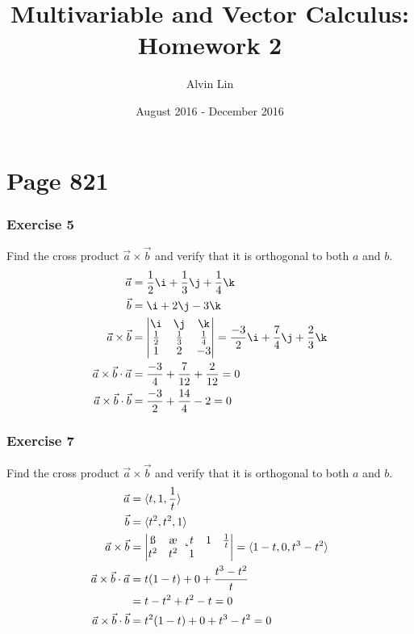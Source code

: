 \documentclass[letterpaper, 12pt]{math}
\title{Multivariable and Vector Calculus: Homework 2}
\author{Alvin Lin}
\date{August 2016 - December 2016}
\begin{document}
\maketitle

\section*{Page 821}

\subsubsection*{Exercise 5}
Find the cross product \( \vec{a}\times\vec{b} \) and verify that it is
orthogonal to both \( a \) and \( b \).
\begin{align*}
  \vec{a} &= \frac{1}{2}\i+\frac{1}{3}\j+\frac{1}{4}\k \\
  \vec{b} &= \i+2\j-3\k \\
  \vec{a}\times\vec{b} &= \begin{vmatrix}
    \i & \j & \k \\
    \frac{1}{2} & \frac{1}{3} & \frac{1}{4} \\
    1 & 2 & -3
  \end{vmatrix} = \frac{-3}{2}\i+\frac{7}{4}\j+\frac{2}{3}\k \\
  \vec{a}\times\vec{b}\cdot\vec{a} &=
    \frac{-3}{4}+\frac{7}{12}+\frac{2}{12} = 0 \\
  \vec{a}\times\vec{b}\cdot\vec{b} &=
    \frac{-3}{2}+\frac{14}{4}-2 = 0
\end{align*}

\subsubsection*{Exercise 7}
Find the cross product \( \vec{a}\times\vec{b} \) and verify that it is
orthogonal to both \( a \) and \( b \).
\begin{align*}
  \vec{a} &= \langle t,1,\frac{1}{t}\rangle \\
  \vec{b} &= \langle t^2,t^2,1\rangle \\
  \vec{a}\times\vec{b} &= \begin{vmatrix}
    \i & \j & \k \\
    t & 1 & \frac{1}{t} \\
    t^2 & t^2 & 1
  \end{vmatrix} = \langle1-t,0,t^3-t^2\rangle \\
  \vec{a}\times\vec{b}\cdot\vec{a} &=
    t(1-t)+0+\frac{t^3-t^2}{t} \\
  &= t-t^2+t^2-t = 0 \\
  \vec{a}\times\vec{b}\cdot\vec{b} &=
    t^2(1-t)+0+t^3-t^2 = 0
\end{align*}
\end{document}
